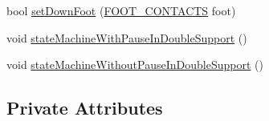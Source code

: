 \begin{DoxyCompactItemize}
\item 
bool \hyperlink{classSteppingDemoClient_a930123dad5658ea8a3bb5f23cb4cb369}{set\-Down\-Foot} (\hyperlink{SteppingDemoClient_8h_ab0673d7f17cdd57b8fa124abb330287f}{\-F\-O\-O\-T\-\_\-\-C\-O\-N\-T\-A\-C\-T\-S} foot)
\item 
void \hyperlink{classSteppingDemoClient_a346a8fd10641897532a26f598db7799d}{state\-Machine\-With\-Pause\-In\-Double\-Support} ()
\item 
void \hyperlink{classSteppingDemoClient_a256284578a6b9818a8f726451d2fb2c4}{state\-Machine\-Without\-Pause\-In\-Double\-Support} ()
\end{DoxyCompactItemize}
\subsection*{\-Private \-Attributes}
